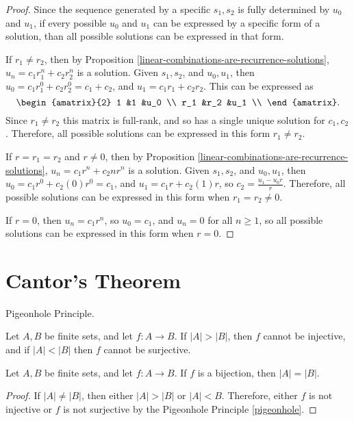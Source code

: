 \documentclass[12pt]{article}
\begin{document}
\begin{proof}
    Since the sequence generated by a specific $s_1, s_2$ is fully determined by $u_0$ and $u_1$, if every possible $u_0$ and $u_1$ can be expressed by a specific form of a solution, than all possible solutions can be expressed in that form.

    If $r_1 \neq r_2$, then by Proposition \ref{linear-combinations-are-recurrence-solutions}, $u_n = c_1r_1^n + c_2r_2^n$ is a solution. Given $s_1, s_2$, and $u_0, u_1$, then $u_0 = c_1r_1^0 + c_2r_2^0 = c_1 + c_2$, and $u_1 = c_1r_1 + c_2r_2$. This can be expressed as
    \[\begin{amatrix}{2}
        1 &1 &u_0 \\
        r_1 &r_2 &u_1 \\
    \end{amatrix}.\] Since $r_1 \neq r_2$ this matrix is full-rank, and so has a single unique solution for $c_1, c_2$. Therefore, all possible solutions can be expressed in this form $r_1 \neq r_2$.

    If $r = r_1 = r_2$ and $r \neq 0$, then by Proposition \ref{linear-combinations-are-recurrence-solutions}, $u_n = c_1r^n + c_2nr^n$ is a solution. Given $s_1, s_2$, and $u_0, u_1$, then $u_0 = c_1r^0 + c_2(0)r^0 = c_1$, and $u_1 = c_1r + c_2(1)r$, so $c_2 = \frac{u_1 - u_0r}{r}$. Therefore, all possible solutions can be expressed in this form when $r_1 = r_2 \neq 0$.

    If $r = 0$, then $u_n = c_1r^n$, so $u_0 = c_1$, and $u_n = 0$ for all $n \geq 1$, so all possible solutions can be expressed in this form when $r = 0$.
\end{proof}

\section{Cantor's Theorem}

\begin{thm}\label{pigeonhole}
    Pigeonhole Principle.

    Let $A, B$ be finite sets, and let $f: A \to B$. If $|A| > |B|$, then $f$ cannot be injective, and if $|A| < |B|$ then $f$ cannot be surjective.
\end{thm}

\begin{prop}
    Let $A, B$ be finite sets, and let $f: A \to B$. If $f$ is a bijection, then $|A| = |B|$.
\end{prop}

\begin{proof}
    If $|A| \neq |B|$, then either $|A| > |B|$ or $|A| < B$. Therefore, either $f$ is not injective or $f$ is not surjective by the Pigeonhole Principle \ref{pigeonhole}.
\end{proof}
\end{document}
